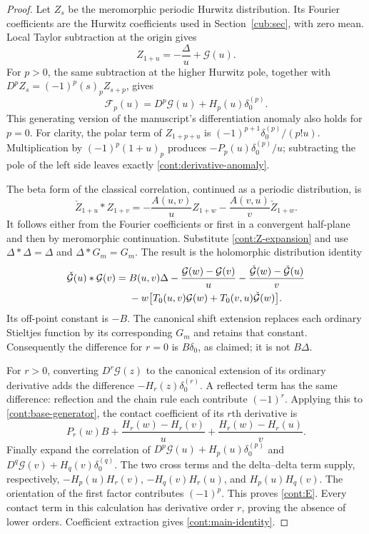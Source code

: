 \begin{proof}
Let $Z_s$ be the meromorphic periodic Hurwitz distribution.  Its
Fourier coefficients are the Hurwitz coefficients used in
Section~\ref{cub:sec}, with zero mean.  Local Taylor subtraction at
the origin gives
\begin{equation}\label{cont:Z-expansion}
 Z_{1+u}=-\frac\Delta u+\mathcal G(u).
\end{equation}
For $p>0$, the same subtraction at the higher Hurwitz pole, together
with $D^pZ_s=(-1)^p(s)_pZ_{s+p}$, gives
\begin{equation}\label{cont:derivative-anomaly}
 \mathcal F_p(u)=D^p\mathcal G(u)+H_p(u)\delta_0^{(p)}.
\end{equation}
This generating version of the manuscript's differentiation anomaly
also holds for $p=0$.  For clarity, the polar term of
$Z_{1+p+u}$ is $(-1)^{p+1}\delta_0^{(p)}/(p!u)$.
Multiplication by $(-1)^p(1+u)_p$ produces
$-P_p(u)\delta_0^{(p)}/u$; subtracting the pole of the left side
leaves exactly \eqref{cont:derivative-anomaly}.

The beta form of the classical correlation, continued as a periodic
distribution, is
\[
 \check Z_{1+u}*Z_{1+v}
 =-\frac{A(u,v)}u Z_{1+w}
   -\frac{A(v,u)}v\check Z_{1+w}.
\]
It follows either from the Fourier coefficients or first in a
convergent half-plane and then by meromorphic continuation.
Substitute \eqref{cont:Z-expansion} and use
$\Delta*\Delta=\Delta$ and $\Delta*G_m=G_m$.
The result is the holomorphic distribution identity
\begin{align}
 \check{\mathcal G}(u)*\mathcal G(v)
 ={}&B(u,v)\Delta
 -\frac{\mathcal G(w)-\mathcal G(v)}u
 -\frac{\check{\mathcal G}(w)-\check{\mathcal G}(u)}v
       \notag\\
 &-w\bigl[T_0(u,v)\mathcal G(w)
              +T_0(v,u)\check{\mathcal G}(w)\bigr].
 \label{cont:base-generator}
\end{align}
Its off-point constant is $-B$.  The canonical shift extension
replaces each ordinary Stieltjes function by its corresponding $G_m$
and retains that constant.  Consequently the difference for $r=0$
is $B\delta_0$, as claimed; it is not $B\Delta$.

For $r>0$, converting $D^r\mathcal G(z)$ to the canonical extension
of its ordinary derivative adds the difference
$-H_r(z)\delta_0^{(r)}$.  A reflected term has the same difference:
reflection and the chain rule each contribute $(-1)^r$.
Applying this to \eqref{cont:base-generator}, the contact coefficient
of its $r$th derivative is
\[
 P_r(w)B+
 \frac{H_r(w)-H_r(v)}u+
 \frac{H_r(w)-H_r(u)}v.
\]
Finally expand the correlation of
$D^p\mathcal G(u)+H_p(u)\delta_0^{(p)}$ and
$D^q\mathcal G(v)+H_q(v)\delta_0^{(q)}$.
The two cross terms and the delta--delta term supply, respectively,
$-H_p(u)H_r(v)$, $-H_q(v)H_r(u)$, and $H_p(u)H_q(v)$.
The orientation of the first factor contributes $(-1)^p$.
This proves \eqref{cont:E}.  Every contact term in this calculation
has derivative order $r$, proving the absence of lower orders.
Coefficient extraction gives \eqref{cont:main-identity}.
\end{proof}

